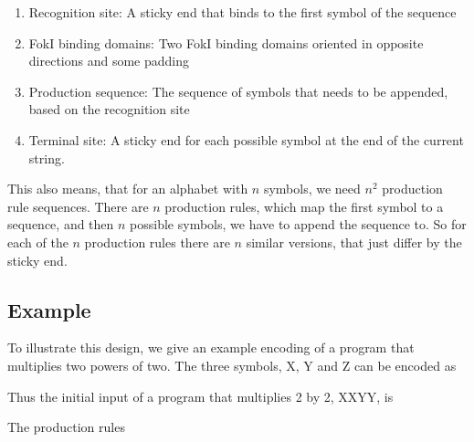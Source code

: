 \documentclass[
11pt, %
a4paper, %
oneside, %
headinclude,footinclude, %
BCOR5mm, %
]{scrartcl}
\begin{document}
\begin{enumerate}
  \item Recognition site: A sticky end that binds to the first symbol of the sequence
  \item FokI binding domains: Two FokI binding domains oriented in opposite directions and some padding
  \item Production sequence: The sequence of symbols that needs to be appended, based on the recognition site
  \item Terminal site: A sticky end for each possible symbol at the end of the current string.
\end{enumerate}

This also means, that for an alphabet with $n$ symbols, we need $n^2$ production
rule sequences.
There are $n$ production rules, which map the first symbol to a sequence, and
then $n$ possible symbols, we have to append the sequence to.
So for each of the $n$ production rules there are $n$ similar versions, that
just differ by the sticky end.

\subsection{Example}
To illustrate this design, we give an example encoding of a program that
multiplies two powers of two.
The three symbols, X, Y and Z can be encoded as

\begin{center}
\end{center}
Thus the initial input of a program that multiplies 2 by 2, XXYY, is

\begin{center}
\end{center}
The production rules
\begin{center}
\end{center}
\end{document}
